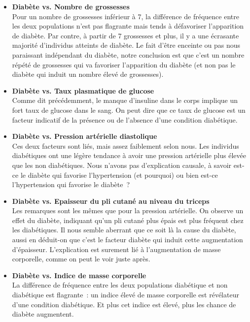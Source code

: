 \documentclass[a4paper,11pt]{report}
\begin{document}
\begin{itemize}
	\item \textbf{Diabète vs. Nombre de grossesses}
	\\ Pour un nombre de grossesses inférieur à 7, la différence de fréquence entre les deux populations n'est pas flagrante mais tends à défavoriser l'apparition de diabète. Par contre, à partir de 7 grossesses et plus, il y a une écrasante majorité d'individus atteints de diabète. Le fait d'être enceinte ou pas nous paraissant indépendant du diabète, notre conclusion est que c'est un nombre répété de grossesses qui va favoriser l'apparition du diabète (et non pas le diabète qui induit un nombre élevé de grossesses).
		
	\item \textbf{Diabète vs. Taux plasmatique de glucose}
	\\ Comme dit précédemment, le manque d'insuline dans le corps implique un fort taux de glucose dans le sang. On peut dire que ce taux de glucose est un facteur indicatif de la présence ou de l'absence d'une condition diabétique.
		
	\item \textbf{Diabète vs. Pression artérielle diastolique}
	\\ Ces deux facteurs sont liés, mais assez faiblement selon nous. Les individus diabétiques ont une légère tendance à avoir une pression artérielle plus élevée que les non diabétiques. Nous n'avons pas d'explication causale, à savoir est-ce le diabète qui favorise l'hypertension (et pourquoi) ou bien est-ce l'hypertension qui favorise le diabète~?
		
	\item \textbf{Diabète vs. Epaisseur du pli cutané au niveau du triceps}
	\\ Les remarques sont les mêmes que pour la pression artérielle. On observe un effet du diabète, indiquant qu'un pli cutané plus épais est plus fréquent chez les diabétiques. Il nous semble aberrant que ce soit là la cause du diabète, aussi en déduit-on que c'est le facteur diabète qui induit cette augmentation d'épaisseur. L'explication est surement lié à l'augmentation de masse corporelle, comme on peut le voir juste après.
		
	\item \textbf{Diabète vs. Indice de masse corporelle}
	\\ La différence de fréquence entre les deux populations diabétique et non diabétique est flagrante~: un indice élevé de masse corporelle est révélateur d'une condition diabétique. Et plus cet indice est élevé, plus les chance de diabète augmentent.
		

\end{itemize}
\end{document}
